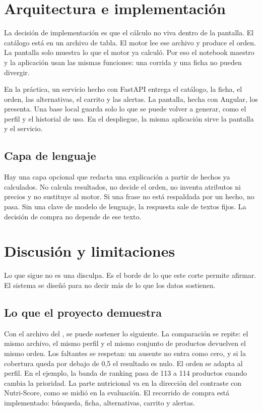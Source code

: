 \section{Arquitectura e implementación}

La decisión de implementación es que el cálculo no viva dentro de la pantalla. El catálogo está en un archivo de tabla. El motor lee ese archivo y produce el orden. La pantalla solo muestra lo que el motor ya calculó. Por eso el notebook maestro y la aplicación usan las mismas funciones: una corrida y una ficha no pueden divergir.

En la práctica, un servicio hecho con FastAPI entrega el catálogo, la ficha, el orden, las alternativas, el carrito y las alertas. La pantalla, hecha con Angular, los presenta. Una base local guarda solo lo que se puede volver a generar, como el perfil y el historial de uso. En el despliegue, la misma aplicación sirve la pantalla y el servicio.

\subsection{Capa de lenguaje}

Hay una capa opcional que redacta una explicación a partir de hechos ya calculados. No calcula resultados, no decide el orden, no inventa atributos ni precios y no sustituye al motor. Si una frase no está respaldada por un hecho, no pasa. Sin una clave de modelo de lenguaje, la respuesta sale de textos fijos. La decisión de compra no depende de ese texto.

\section{Discusión y limitaciones}

Lo que sigue no es una disculpa. Es el borde de lo que este corte permite afirmar. El sistema se diseñó para no decir más de lo que los datos sostienen.

\subsection{Lo que el proyecto demuestra}

Con el archivo del \corte, se puede sostener lo siguiente. La comparación se repite: el mismo archivo, el mismo perfil y el mismo conjunto de productos devuelven el mismo orden. Los faltantes se respetan: un ausente no entra como cero, y si la cobertura queda por debajo de 0{,}5 el resultado es nulo. El orden se adapta al perfil. En el ejemplo, la banda de ranking pasa de 113 a 114 productos cuando cambia la prioridad. La parte nutricional va en la dirección del contraste con Nutri-Score, como se midió en la evaluación. El recorrido de compra está implementado: búsqueda, ficha, alternativas, carrito y alertas.

